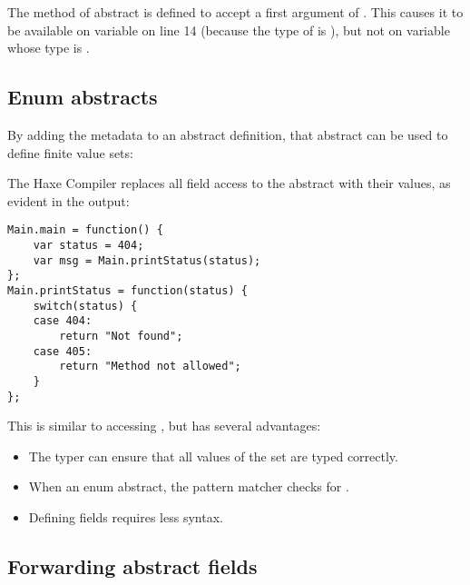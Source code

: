 The method  of abstract  is defined to accept a first argument of . This causes it to be available on variable  on line 14 (because the type of  is ), but not on variable  whose type is .



\subsection{Enum abstracts}
\label{types-abstract-enum}

By adding the  metadata to an abstract definition, that abstract can be used to define finite value sets:


The Haxe Compiler replaces all field access to the  abstract with their values, as evident in the  output:

\begin{lstlisting}
Main.main = function() {
	var status = 404;
	var msg = Main.printStatus(status);
};
Main.printStatus = function(status) {
	switch(status) {
	case 404:
		return "Not found";
	case 405:
		return "Method not allowed";
	}
};
\end{lstlisting}

This is similar to accessing , but has several advantages:

\begin{itemize}
	\item The typer can ensure that all values of the set are typed correctly.
	\item When  an enum abstract, the pattern matcher checks for .
	\item Defining fields requires less syntax.
\end{itemize}


\subsection{Forwarding abstract fields}
\label{types-abstract-forward}

